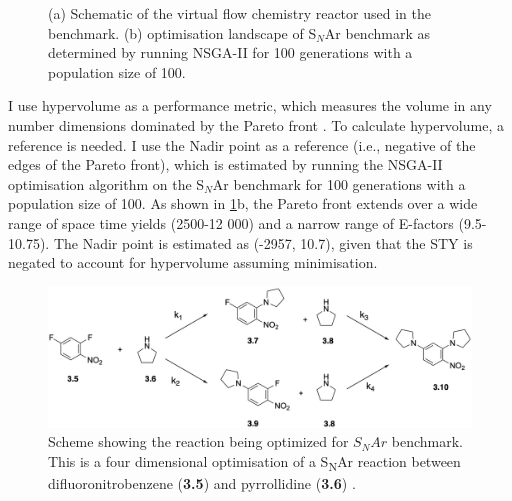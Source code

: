 \begin{figure}
    \centering
    \caption{(a) Schematic of the virtual flow chemistry reactor used in the benchmark. (b) optimisation landscape of S$_N$Ar benchmark as determined by running NSGA-II for 100 generations with a population size of 100.}
    \label{fig:snar}

\end{figure}

I use hypervolume as a performance metric, which measures the volume in any number dimensions dominated by the Pareto front \cite{Emmerich2016}. To calculate hypervolume, a reference is needed. I use the Nadir point as a reference (i.e., negative of the edges of the Pareto front), which is estimated by running the NSGA-II optimisation algorithm \cite{Deb2002} on the S$_N$Ar benchmark for 100 generations with a population size of 100. As shown in \ref{fig:snar}b, the Pareto front  extends over a wide range of space time yields (2500-12 000) and a narrow range of E-factors (9.5-10.75). The Nadir point is estimated as (-2957, 10.7), given that the STY is negated to account for hypervolume assuming minimisation.

\begin{figure}
    \centering
    \includegraphics[width=\textwidth]{gfx/Chapter03/snar_benchmark_scheme_thesis.png}
    \caption{Scheme showing the reaction being optimized for $S_NAr$ benchmark. This is a four dimensional optimisation of a  S\textsubscript{N}Ar reaction between difluoronitrobenzene (\textbf{3.5}) and pyrrollidine (\textbf{3.6}) \cite{Hone2017}.}
    \label{fig:snar_benchmark}
\end{figure}

